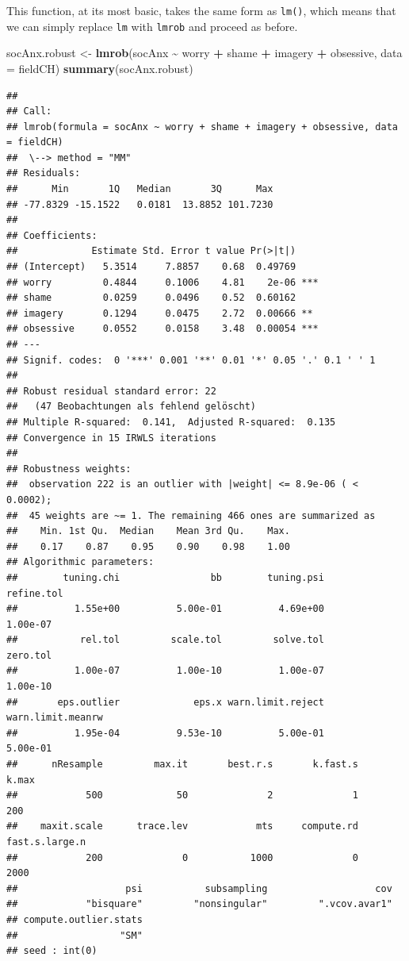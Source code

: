 \documentclass[
]{article}
\newenvironment{Shaded}{\begin{snugshade}}{\end{snugshade}}
\newcommand{\AttributeTok}[1]{\textcolor[rgb]{0.13,0.29,0.53}{#1}}
\newcommand{\FunctionTok}[1]{\textcolor[rgb]{0.13,0.29,0.53}{\textbf{#1}}}
\newcommand{\NormalTok}[1]{#1}
\newcommand{\OtherTok}[1]{\textcolor[rgb]{0.56,0.35,0.01}{#1}}
\newcommand{\SpecialCharTok}[1]{\textcolor[rgb]{0.81,0.36,0.00}{\textbf{#1}}}
\begin{document}
This function, at its most basic, takes the same form as \texttt{lm()}, which means that we can simply replace \texttt{lm} with \texttt{lmrob} and proceed as before.

\begin{Shaded}
\begin{Highlighting}[]
\NormalTok{    socAnx.robust }\OtherTok{\textless{}{-}} \FunctionTok{lmrob}\NormalTok{(socAnx }\SpecialCharTok{\textasciitilde{}}\NormalTok{ worry }\SpecialCharTok{+}\NormalTok{ shame }\SpecialCharTok{+}\NormalTok{ imagery }\SpecialCharTok{+}\NormalTok{ obsessive, }\AttributeTok{data =}\NormalTok{ fieldCH)}
    \FunctionTok{summary}\NormalTok{(socAnx.robust)}
\end{Highlighting}
\end{Shaded}

\begin{verbatim}
## 
## Call:
## lmrob(formula = socAnx ~ worry + shame + imagery + obsessive, data = fieldCH)
##  \--> method = "MM"
## Residuals:
##      Min       1Q   Median       3Q      Max 
## -77.8329 -15.1522   0.0181  13.8852 101.7230 
## 
## Coefficients:
##             Estimate Std. Error t value Pr(>|t|)    
## (Intercept)   5.3514     7.8857    0.68  0.49769    
## worry         0.4844     0.1006    4.81    2e-06 ***
## shame         0.0259     0.0496    0.52  0.60162    
## imagery       0.1294     0.0475    2.72  0.00666 ** 
## obsessive     0.0552     0.0158    3.48  0.00054 ***
## ---
## Signif. codes:  0 '***' 0.001 '**' 0.01 '*' 0.05 '.' 0.1 ' ' 1
## 
## Robust residual standard error: 22 
##   (47 Beobachtungen als fehlend gelöscht)
## Multiple R-squared:  0.141,  Adjusted R-squared:  0.135 
## Convergence in 15 IRWLS iterations
## 
## Robustness weights: 
##  observation 222 is an outlier with |weight| <= 8.9e-06 ( < 0.0002); 
##  45 weights are ~= 1. The remaining 466 ones are summarized as
##    Min. 1st Qu.  Median    Mean 3rd Qu.    Max. 
##    0.17    0.87    0.95    0.90    0.98    1.00 
## Algorithmic parameters: 
##        tuning.chi                bb        tuning.psi        refine.tol 
##          1.55e+00          5.00e-01          4.69e+00          1.00e-07 
##           rel.tol         scale.tol         solve.tol          zero.tol 
##          1.00e-07          1.00e-10          1.00e-07          1.00e-10 
##       eps.outlier             eps.x warn.limit.reject warn.limit.meanrw 
##          1.95e-04          9.53e-10          5.00e-01          5.00e-01 
##      nResample         max.it       best.r.s       k.fast.s          k.max 
##            500             50              2              1            200 
##    maxit.scale      trace.lev            mts     compute.rd fast.s.large.n 
##            200              0           1000              0           2000 
##                   psi           subsampling                   cov 
##            "bisquare"         "nonsingular"         ".vcov.avar1" 
## compute.outlier.stats 
##                  "SM" 
## seed : int(0)
\end{verbatim}
\end{document}
